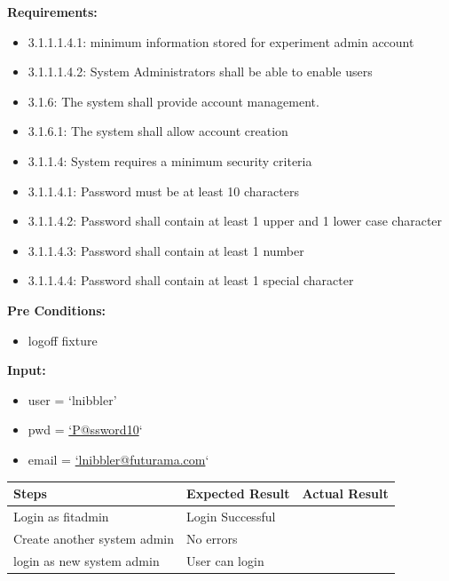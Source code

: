 \documentclass[letterpaper,10pt,english]{sphinxmanual}
\begin{document}
\begin{fulllineitems}
\label{STD/test_create_account:test_create_account.test_create_system_admin}
\textbf{Requirements:}
\begin{itemize}
\item {} 
3.1.1.1.4.1: minimum information stored for experiment admin account

\item {} 
3.1.1.1.4.2: System Administrators shall be able to enable users

\item {} 
3.1.6: The system shall provide account management.

\item {} 
3.1.6.1: The system shall allow account creation

\item {} 
3.1.1.4: System requires a minimum security criteria

\item {} 
3.1.1.4.1: Password must be at least 10 characters

\item {} 
3.1.1.4.2: Password shall contain at least 1 upper and 1 lower case character

\item {} 
3.1.1.4.3: Password shall contain at least 1 number

\item {} 
3.1.1.4.4: Password shall contain at least 1 special character

\end{itemize}

\textbf{Pre Conditions:}
\begin{itemize}
\item {} 
logoff fixture

\end{itemize}

\textbf{Input:}
\begin{itemize}
\item {} 
user = `lnibbler'

\item {} 
pwd = \href{mailto:'P@ssword10}{`P@ssword10}`

\item {} 
email = \href{mailto:'lnibbler@futurama.com}{`lnibbler@futurama.com}`

\end{itemize}

\begin{tabulary}{\linewidth}{|L|L|L|}
\hline
\textsf{\relax 
Steps
} & \textsf{\relax 
Expected Result
} & \textsf{\relax 
Actual Result
}\\
\hline
Login as fitadmin
 & 
Login Successful
 & \\
\hline
Create another system admin
 & 
No errors
 & \\
\hline
login as new system admin
 & 
User can login
 & \\
\hline\end{tabulary}


\end{fulllineitems}
\end{document}
